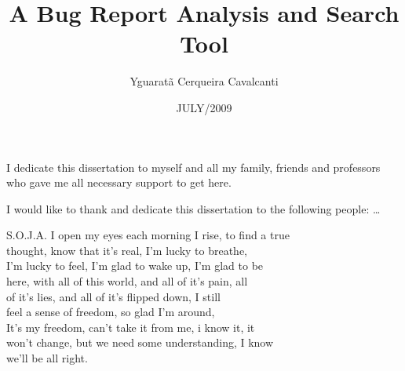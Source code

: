 \documentclass[en,twoside,onehalfspacing]{risethesis}
\title{A Bug Report Analysis and Search Tool}
\date{JULY/2009}
\author{Yguaratã Cerqueira Cavalcanti}
\begin{document}
\frontmatter
\frontpage
\presentationpage

\begin{dedicatory}
I dedicate this dissertation to myself and all my family, friends and
professors who gave me all necessary support to get here.
\end{dedicatory}

\acknowledgements
I would like to thank and dedicate this dissertation to the following people:
\ldots

\begin{epigraph}{S.O.J.A.}
I open my eyes each morning I rise, to find a true\\
thought, know that it's real, I'm lucky to breathe,\\
I'm lucky to feel, I'm glad to wake up, I'm glad to be\\
here, with all of this world, and all of it's pain, all\\
of it's lies, and all of it's flipped down, I still\\
feel a sense of freedom, so glad I'm around,\\
\vspace{0.5cm}
It's my freedom, can't take it from me, i know it, it\\
won't change, but we need some understanding, I know\\
we'll be all right.
\end{epigraph}

\resumo


\abstract


\tableofcontents

\listoffigures

\listoftables

\listofacronyms


\mainmatter






\clearpage
\addappheadtotoc
\appendix
\appendixpage

\end{document}
